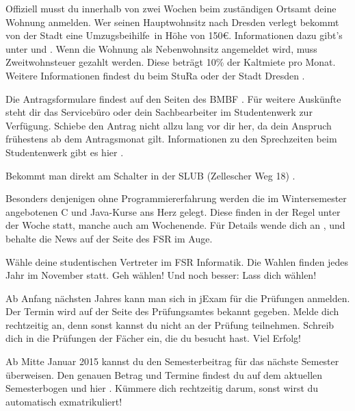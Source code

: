 Offiziell musst du innerhalb von zwei Wochen beim zuständigen Ortsamt  deine Wohnung anmelden.
Wer seinen Hauptwohnsitz nach Dresden verlegt bekommt von der Stadt eine \glqq Umzugsbeihilfe\grqq\ in Höhe von 150\euro.
Informationen dazu gibt's unter  und .
Wenn die Wohnung als Nebenwohnsitz angemeldet wird, muss Zweitwohnsteuer gezahlt werden. Diese beträgt 10\% der Kaltmiete pro Monat. Weitere Informationen findest du beim StuRa  oder der Stadt Dresden .

Die Antragsformulare findest auf den Seiten des BMBF . Für weitere Auskünfte steht dir das Servicebüro oder dein Sachbearbeiter im Studentenwerk zur Verfügung.
Schiebe den Antrag nicht allzu lang vor dir her, da dein Anspruch frühestens ab dem Antragsmonat gilt.
Informationen zu den Sprechzeiten beim Studentenwerk gibt es hier .

Bekommt man direkt am Schalter in der SLUB (Zellescher Weg 18) .

Besonders denjenigen ohne Programmiererfahrung werden die im Wintersemester angebotenen C und Java-Kurse ans Herz gelegt.
Diese finden in der Regel unter der Woche statt, manche auch am Wochenende.
Für Details wende dich an ,  und behalte die News auf der Seite des FSR  im Auge.

Wähle deine studentischen Vertreter im FSR Informatik.
Die Wahlen finden jedes Jahr im November statt.
Geh wählen!
Und noch besser: Lass dich wählen!

Ab Anfang nächsten Jahres kann man sich in jExam für die Prüfungen anmelden. Der Termin wird auf der Seite des Prüfungsamtes bekannt gegeben. Melde dich rechtzeitig an, denn sonst kannst du nicht an der Prüfung teilnehmen.
Schreib dich in die Prüfungen der Fächer ein, die du besucht hast.
Viel Erfolg!

Ab Mitte Januar 2015 kannst du den Semesterbeitrag für das nächste Semester überweisen.
Den genauen Betrag und Termine findest du auf dem aktuellen Semesterbogen und hier .
Kümmere dich rechtzeitig darum, sonst wirst du automatisch exmatrikuliert!

